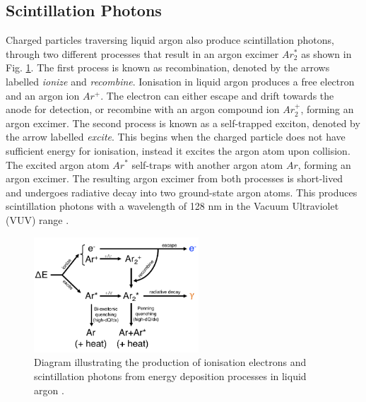 \subsection{Scintillation Photons}

\label{sec:scintillation}

Charged particles traversing liquid argon also produce scintillation photons, through two different processes that result in an argon excimer $Ar_{2}^{*}$ as shown in Fig. \ref{fig:recomb_diagram}.  
The first process is known as recombination, denoted by the arrows labelled \textit{ionize} and \textit{recombine}.
Ionisation in liquid argon produces a free electron and an argon ion $Ar^{+}$.
The electron can either escape and drift towards the anode for detection, or recombine with an argon compound ion $Ar_2^{+}$, forming an argon excimer.
The second process is known as a self-trapped exciton, denoted by the arrow labelled \textit{excite}.
This begins when the charged particle does not have sufficient energy for ionisation, instead it excites the argon atom upon collision.
The excited argon atom $Ar^{*}$ self-traps with another argon atom $Ar$, forming an argon excimer.
The resulting argon excimer from both processes is short-lived and undergoes radiative decay into two ground-state argon atoms.
This produces scintillation photons with a wavelength of 128 nm in the Vacuum Ultraviolet (VUV) range \cite{Lariat}.

\begin{figure}[ht!] 
\centering    
\includegraphics[width=0.55\textwidth]{recomb_diagram}
\caption[recomb_diagram]{
Diagram illustrating the production of ionisation electrons and scintillation photons from energy deposition processes in liquid argon \cite{Lariat}.
}
\label{fig:recomb_diagram}
\end{figure}

